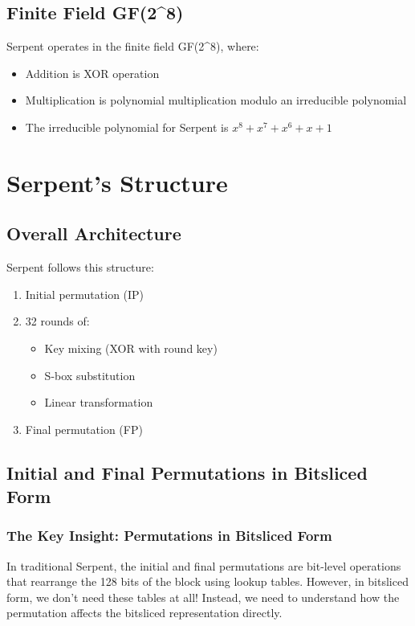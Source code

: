 \documentclass[12pt,a4paper]{article}
\begin{document}
\subsection{Finite Field GF(2^8)}
Serpent operates in the finite field GF(2^8), where:
\begin{itemize}
    \item Addition is XOR operation
    \item Multiplication is polynomial multiplication modulo an irreducible polynomial
    \item The irreducible polynomial for Serpent is $x^8 + x^7 + x^6 + x + 1$
\end{itemize}

\section{Serpent's Structure}

\subsection{Overall Architecture}
Serpent follows this structure:
\begin{enumerate}
    \item Initial permutation (IP)
    \item 32 rounds of:
        \begin{itemize}
            \item Key mixing (XOR with round key)
            \item S-box substitution
            \item Linear transformation
        \end{itemize}
    \item Final permutation (FP)
\end{enumerate}

\subsection{Initial and Final Permutations in Bitsliced Form}

\subsubsection{The Key Insight: Permutations in Bitsliced Form}
In traditional Serpent, the initial and final permutations are bit-level operations that rearrange the 128 bits of the block using lookup tables. However, in bitsliced form, we don't need these tables at all! Instead, we need to understand how the permutation affects the bitsliced representation directly.
\end{document}
